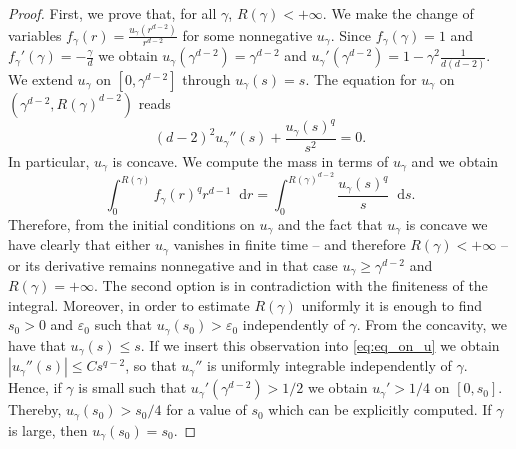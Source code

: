 \documentclass[11pt,a4paper]{article}
\numberwithin{equation}{section}
\theoremstyle{plain}
\theoremstyle{remark}
\newcommand{\diff}{\mathop{}\!\mathrm{d}}
\begin{document}
\begin{proof}
First, we prove that, for all $\gamma$, $R(\gamma)<+\infty$. We make the change of variables $f_{\gamma}(r) = \frac{u_{\gamma}(r^{d-2})}{r^{d-2}}$ for some nonnegative $u_{\gamma}$. Since $f_{\gamma}(\gamma)=1$ and $f_{\gamma}'(\gamma)=-\frac{\gamma}{d}$ we obtain $u_{\gamma}\left(\gamma^{d-2}\right)=\gamma^{d-2}$ and $u_{\gamma}'(\gamma^{d-2})=1-\gamma^2\frac{1}{d(d-2)}$. We extend $u_\gamma$ on $[0,\gamma^{d-2}]$ through $u_\gamma(s)=s$. The equation for $u_\gamma$ on $(\gamma^{d-2},R(\gamma)^{d-2})$ reads
\begin{equation}\label{eq:eq_on_u}
    (d-2)^2 u_{\gamma}''(s) + \frac{u_{\gamma}(s)^{q}}{s^{2}}=0.
\end{equation}
In particular, $u_{\gamma}$ is concave. We compute the mass in terms of $u_{\gamma}$ and we obtain
$$
    \int_{0}^{R(\gamma)} f_{\gamma}(r)^{q}r^{d-1}\diff r= \int_{0}^{R(\gamma)^{d-2}}\frac{u_{\gamma}(s)^{q}}{s}\diff s.
$$
Therefore, 
from the initial conditions on $u_{\gamma}$ and the fact that $u_{\gamma}$ is concave we have clearly that either $u_{\gamma}$ vanishes in finite time -- and therefore $R(\gamma)<+\infty$ --  or its derivative remains nonnegative and in that case $u_{\gamma}\ge \gamma^{d-2}$ and $R(\gamma)=+\infty$. The second option is in contradiction with the finiteness of the integral. Moreover, in order to estimate $R(\gamma)$ uniformly it is enough to find $s_0>0$ and $\varepsilon_0$ such that $u_\gamma(s_0)>\varepsilon_0$ independently of $\gamma$. 
From the concavity, we have that $u_\gamma(s)\leq s$. If we insert this observation into \eqref{eq:eq_on_u} we obtain $|u_\gamma''(s)|\leq Cs^{q-2}$, so that $u_\gamma''$ is uniformly integrable independently of $\gamma$. Hence, if $\gamma$ is small such that $u_\gamma'(\gamma^{d-2})>1/2$ we obtain $u_\gamma'>1/4$ on $[0,s_0]$. Thereby, $u_\gamma(s_0)>s_0/4$ for a value of $s_0$ which can be explicitly computed. If $\gamma$ is large, then $u_\gamma(s_0)=s_0$.

\end{proof}
\end{document}
